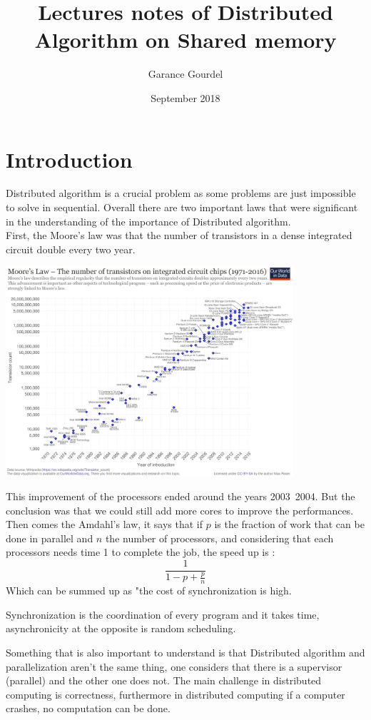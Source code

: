 \documentclass{article}
\title{Lectures notes of Distributed Algorithm on Shared memory}
\author{Garance Gourdel}
\date{September 2018}
\theoremstyle{definition}
\begin{document}
\maketitle
\tableofcontents

\section{Introduction}

Distributed algorithm is a crucial problem as some problems are just impossible to solve in sequential.
Overall there are two important laws that were significant in the understanding of the importance of Distributed algorithm.
\\
First, the Moore's law was that the number of transistors in a dense integrated circuit double every two year.
\begin{center}
	\includegraphics[width=0.8\textwidth]{Moore}
\end{center}
This improvement of the processors ended around the years 2003~2004. But the conclusion was that we could still add more cores to improve the performances.
\\

Then comes the Amdahl's law, it says that if $p$ is the fraction of work that can be done in parallel and $n$ the number of processors, and considering that each processors needs time 1 to complete the job, the speed up is : $$ \frac{1}{1- p + \frac{p}{n}} $$
Which can be summed up as "the cost of synchronization is high.

Synchronization is the coordination of every program and it takes time, asynchronicity at the opposite is random scheduling.

Something that is also important to understand is that Distributed algorithm and parallelization aren't the same thing, one considers that there is a supervisor (parallel) and the other one does not.
The main challenge in distributed computing is correctness, furthermore in distributed computing if a computer crashes, no computation can be done.
\end{document}
